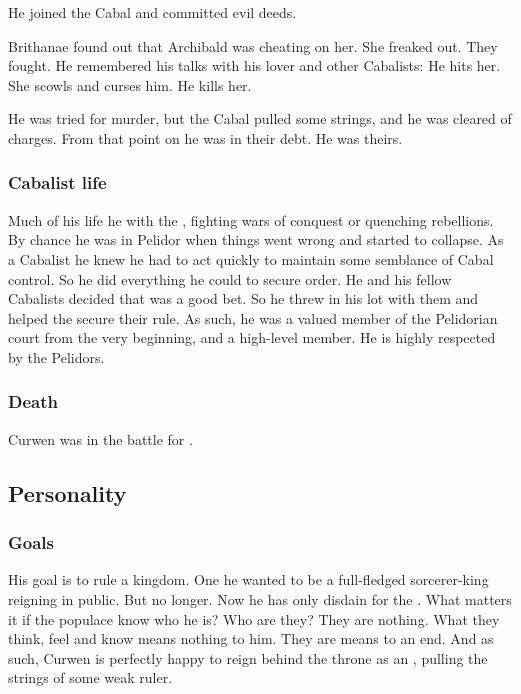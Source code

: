 He joined the Cabal and committed evil deeds.

Brithanae found out that Archibald was cheating on her. 
She freaked out. 
They fought. 
He remembered his talks with his lover and other Cabalists: 
He hits her. 
She scowls and curses him. 
He kills her. 

He was tried for murder, but the Cabal pulled some strings, and he was cleared of charges. 
From that point on he was in their debt. 
He was theirs. 





\subsubsection{Cabalist life}
Much of his life he \travelled with the \Velcadian{} \ishrah{}, fighting wars of conquest or quenching rebellions. 
By chance he was in Pelidor when things went wrong and \GreatVelcad started to collapse. 
As a Cabalist he knew he had to act quickly to maintain some semblance of Cabal control. 
So he did everything he could to secure order. 
He and his fellow Cabalists decided that  was a good bet. 
So he threw in his lot with them and helped the \rayuths secure their rule. 
As such, he was a valued member of the Pelidorian court from the very beginning, and a high-level \ishrah{} member. 
He is highly respected by the Pelidors. 





\subsubsection{Death}
Curwen was  in the battle for \Forclin. 









\subsection{Personality}





\subsubsection{Goals}
His goal is to rule a kingdom. 
One he wanted to be a full-fledged sorcerer-king reigning in public. 
But no longer. 
Now he has only disdain for the . 
What matters it if the populace know who he is? 
Who are they?
They are nothing. 
What they think, feel and know means nothing to him. 
They are means to an end. 
And as such, Curwen is perfectly happy to reign behind the throne as an , pulling the strings of some weak ruler. 





